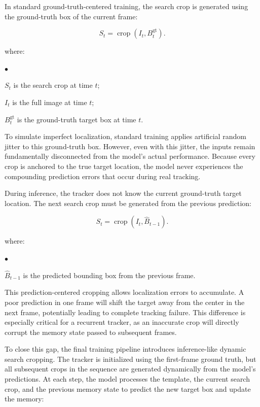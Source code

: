 \documentclass[bachelorthesis]{fer}
\numberwithin{equation}{chapter}
\newcommand{\FormulaNotationWith}[2]{%
    \vspace{-0.6em}
    \noindent\hspace*{1.2em}%
    \begin{minipage}{0.90\textwidth}
        \footnotesize
        #1
        \vspace{0.2em}
        \begin{list}{\(\bullet\)}{
            \setlength{\leftmargin}{1.4em}
            \setlength{\labelwidth}{0.8em}
            \setlength{\labelsep}{0.5em}
            \setlength{\itemsep}{0.05em}
            \setlength{\parsep}{0pt}
            \setlength{\topsep}{0.25em}
            \setlength{\partopsep}{0pt}
        }
            #2
        \end{list}
    \end{minipage}
    \par
    \vspace{0.8em}

}
\newcommand{\FormulaNotation}[1]{\FormulaNotationWith{where:}{#1}}
\begin{document}
    In standard ground-truth-centered training, the search crop is generated using the ground-truth box of the current frame:

    \begin{equation}
        S_t = \operatorname{crop}(I_t, B^{\mathrm{gt}}_t).
    \end{equation}
    \FormulaNotation{
        \item \(S_t\) is the search crop at time \(t\);
        \item \(I_t\) is the full image at time \(t\);
        \item \(B^{\mathrm{gt}}_t\) is the ground-truth target box at time \(t\).
    }

    To simulate imperfect localization, standard training applies artificial random jitter to this ground-truth box. However, even with this jitter, the inputs remain fundamentally disconnected from the model's actual performance. Because every crop is anchored to the true target location, the model never experiences the compounding prediction errors that occur during real tracking.

    During inference, the tracker does not know the current ground-truth target location.
    The next search crop must be generated from the previous prediction:


    \begin{equation}
        S_t = \operatorname{crop}(I_t, \hat{B}_{t-1}).
    \end{equation}
    \FormulaNotation{
        \item \(\hat{B}_{t-1}\) is the predicted bounding box from the previous frame.
    }

    This prediction-centered cropping allows localization errors to accumulate. A poor prediction in one frame will shift the target away from the center in the next frame, potentially leading to complete tracking failure. This difference is especially critical for a recurrent tracker, as an inaccurate crop will directly corrupt the memory state passed to subsequent frames.


    To close this gap, the final training pipeline introduces inference-like dynamic search cropping. The tracker is initialized using the first-frame ground truth, but all subsequent crops in the sequence are generated dynamically from the model's predictions. At each step, the model processes the template, the current search crop, and the previous memory state to predict the new target box and update the memory:
\end{document}
